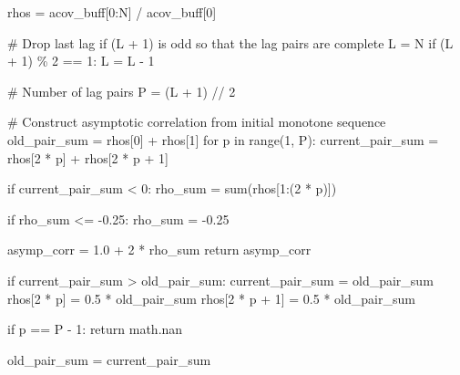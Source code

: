 \documentclass[
  letterpaper,
  DIV=11,
  numbers=noendperiod]{scrartcl}
\newenvironment{Shaded}{\begin{snugshade}}{\end{snugshade}}
\newcommand{\BuiltInTok}[1]{\textcolor[rgb]{0.00,0.23,0.31}{#1}}
\newcommand{\CommentTok}[1]{\textcolor[rgb]{0.37,0.37,0.37}{#1}}
\newcommand{\ControlFlowTok}[1]{\textcolor[rgb]{0.00,0.23,0.31}{#1}}
\newcommand{\DecValTok}[1]{\textcolor[rgb]{0.68,0.00,0.00}{#1}}
\newcommand{\FloatTok}[1]{\textcolor[rgb]{0.68,0.00,0.00}{#1}}
\newcommand{\KeywordTok}[1]{\textcolor[rgb]{0.00,0.23,0.31}{#1}}
\newcommand{\NormalTok}[1]{\textcolor[rgb]{0.00,0.23,0.31}{#1}}
\newcommand{\OperatorTok}[1]{\textcolor[rgb]{0.37,0.37,0.37}{#1}}
\begin{document}
\begin{Shaded}
\begin{Highlighting}[]
\NormalTok{  rhos }\OperatorTok{=}\NormalTok{ acov\_buff[}\DecValTok{0}\NormalTok{:N] }\OperatorTok{/}\NormalTok{ acov\_buff[}\DecValTok{0}\NormalTok{]}
  
  \CommentTok{\# Drop last lag if (L + 1) is odd so that the lag pairs are complete}
\NormalTok{  L }\OperatorTok{=}\NormalTok{ N}
  \ControlFlowTok{if}\NormalTok{ (L }\OperatorTok{+} \DecValTok{1}\NormalTok{) }\OperatorTok{\%} \DecValTok{2} \OperatorTok{==} \DecValTok{1}\NormalTok{:}
\NormalTok{    L }\OperatorTok{=}\NormalTok{ L }\OperatorTok{{-}} \DecValTok{1}
  
  \CommentTok{\# Number of lag pairs}
\NormalTok{  P }\OperatorTok{=}\NormalTok{ (L }\OperatorTok{+} \DecValTok{1}\NormalTok{) }\OperatorTok{//} \DecValTok{2}
  
  \CommentTok{\# Construct asymptotic correlation from initial monotone sequence}
\NormalTok{  old\_pair\_sum }\OperatorTok{=}\NormalTok{ rhos[}\DecValTok{0}\NormalTok{] }\OperatorTok{+}\NormalTok{ rhos[}\DecValTok{1}\NormalTok{]}
  \ControlFlowTok{for}\NormalTok{ p }\KeywordTok{in} \BuiltInTok{range}\NormalTok{(}\DecValTok{1}\NormalTok{, P):}
\NormalTok{    current\_pair\_sum }\OperatorTok{=}\NormalTok{ rhos[}\DecValTok{2} \OperatorTok{*}\NormalTok{ p] }\OperatorTok{+}\NormalTok{ rhos[}\DecValTok{2} \OperatorTok{*}\NormalTok{ p }\OperatorTok{+} \DecValTok{1}\NormalTok{]}
    
    \ControlFlowTok{if}\NormalTok{ current\_pair\_sum }\OperatorTok{\textless{}} \DecValTok{0}\NormalTok{:}
\NormalTok{      rho\_sum }\OperatorTok{=} \BuiltInTok{sum}\NormalTok{(rhos[}\DecValTok{1}\NormalTok{:(}\DecValTok{2} \OperatorTok{*}\NormalTok{ p)])}
      
      \ControlFlowTok{if}\NormalTok{ rho\_sum }\OperatorTok{\textless{}=} \OperatorTok{{-}}\FloatTok{0.25}\NormalTok{:}
\NormalTok{        rho\_sum }\OperatorTok{=} \OperatorTok{{-}}\FloatTok{0.25}
      
\NormalTok{      asymp\_corr }\OperatorTok{=} \FloatTok{1.0} \OperatorTok{+} \DecValTok{2} \OperatorTok{*}\NormalTok{ rho\_sum}
      \ControlFlowTok{return}\NormalTok{ asymp\_corr}
    
    \ControlFlowTok{if}\NormalTok{ current\_pair\_sum }\OperatorTok{\textgreater{}}\NormalTok{ old\_pair\_sum:}
\NormalTok{      current\_pair\_sum }\OperatorTok{=}\NormalTok{ old\_pair\_sum}
\NormalTok{      rhos[}\DecValTok{2} \OperatorTok{*}\NormalTok{ p]     }\OperatorTok{=} \FloatTok{0.5} \OperatorTok{*}\NormalTok{ old\_pair\_sum}
\NormalTok{      rhos[}\DecValTok{2} \OperatorTok{*}\NormalTok{ p }\OperatorTok{+} \DecValTok{1}\NormalTok{] }\OperatorTok{=} \FloatTok{0.5} \OperatorTok{*}\NormalTok{ old\_pair\_sum}

    \ControlFlowTok{if}\NormalTok{ p }\OperatorTok{==}\NormalTok{ P }\OperatorTok{{-}} \DecValTok{1}\NormalTok{:}
      \ControlFlowTok{return}\NormalTok{ math.nan}
    
\NormalTok{    old\_pair\_sum }\OperatorTok{=}\NormalTok{ current\_pair\_sum}

\end{Highlighting}
\end{Shaded}
\end{document}
